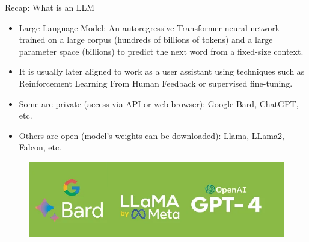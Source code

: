 \documentclass[handout]{beamer}
\begin{document}
\begin{frame}{Recap: What is an LLM}
\begin{scriptsize}
\begin{itemize}
\item  Large Language Model: An autoregressive Transformer neural network trained on a large corpus (hundreds of billions of tokens) and a large parameter space (billions) to predict the next word from a fixed-size context.
\item It is usually later aligned to work as a user assistant using techniques such as Reinforcement Learning From Human Feedback  \cite{ouyang2022training} or supervised fine-tuning.
\item Some are private (access via API or web browser): Google Bard, ChatGPT, etc.
\item Others are open (model's weights can be downloaded): Llama, LLama2, Falcon, etc.
\end{itemize}

 \begin{figure}[h]
        	\includegraphics[scale = 0.4]{pics/gptllama.png}
        \end{figure}

\end{scriptsize}
\end{frame}
\end{document}
